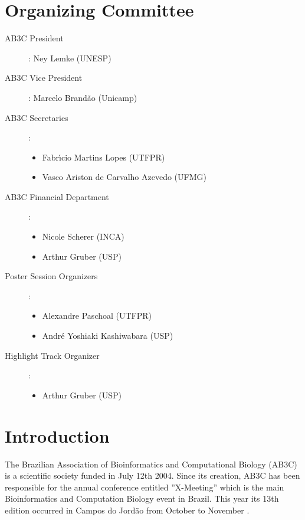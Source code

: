 
\chapter{Organizing Committee}

\begin{description}

 \item[AB3C President]: Ney Lemke (UNESP)

\item[AB3C Vice President]: Marcelo Brand\~ao (Unicamp) 

  
\item[AB3C Secretaries]:

\begin{itemize}
 \item Fabr\'{\i}cio Martins Lopes  (UTFPR)
 \item Vasco Ariston de Carvalho Azevedo (UFMG)
\end{itemize}

\item[AB3C Financial Department]:

\begin{itemize}
\item Nicole Scherer (INCA) 
\item Arthur Gruber (USP)
\end{itemize}


\item[Poster Session Organizers]:

\begin{itemize}
\item Alexandre Paschoal (UTFPR)
\item André Yoshiaki Kashiwabara (USP)
\end{itemize}

\item[Highlight Track Organizer]:
\begin{itemize}
\item Arthur Gruber (USP)
\end{itemize} 
\end{description}


\newpage
\chapter{Introduction}
The Brazilian Association of Bioinformatics and Computational Biology (AB3C) is
a scientific society funded in July 12th 2004.
Since its creation, AB3C has been responsible for the annual conference entitled
''X-Meeting'' which is the main Bioinformatics and Computation Biology event in
Brazil. This year its 13th edition occurred in Campos do Jordão from October
 to November  .

